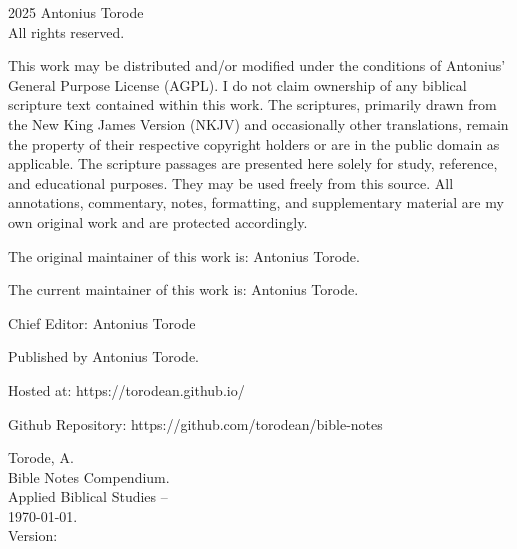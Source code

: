 \pagestyle{empty}
\begingroup
\footnotesize
\parindent 0pt
\parskip \baselineskip
\textcopyright{} 2025 Antonius Torode \\
All rights reserved.

This work may be distributed and/or modified under the conditions of Antonius’ General Purpose License (AGPL). I do not claim ownership of any biblical scripture text contained within this work. The scriptures, primarily drawn from the New King James Version (NKJV) and occasionally other translations, remain the property of their respective copyright holders or are in the public domain as applicable. The scripture passages are presented here solely for study, reference, and educational purposes. They may be used freely from this source. All annotations, commentary, notes, formatting, and supplementary material are my own original work and are protected accordingly.

The original maintainer of this work is: Antonius Torode.

The current maintainer of this work is: Antonius Torode.

Chief Editor: Antonius Torode

Published by Antonius Torode. 

Hosted at: https://torodean.github.io/

Github Repository: https://github.com/torodean/bible-notes

\vfill

Torode, A.\\
\hspace*{1em} Bible Notes Compendium. \\
\hspace*{2em} Applied Biblical Studies -- \\
\hspace*{2em} \today. \\
\hspace*{2em} Version: \version

\endgroup
\clearpage